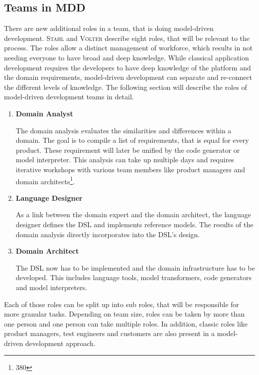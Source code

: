 \subsection{Teams in MDD}

There are new additional roles in a team, that is doing model-driven development. \textsc{Stahl} and \textsc{Völter} \cite{stahl_model-driven_2006} describe eight roles, that will be relevant to the process.
The roles allow a distinct management of workforce, which results in not needing everyone to have broad and deep knowledge.
While classical application development requires the developers to have deep knowledge of the platform and the domain requirements, model-driven development can separate and re-connect the different levels of knowledge.
The following section will describe the roles of model-driven development teams in detail.

\begin{enumerate}
	\item \textbf{Domain Analyst}
	
	The domain analysis evaluates the similarities and differences within a domain.
	The goal is to compile a list of requirements, that is equal for every product.
	These requirement will later be unified by the code generator or model interpreter.
	This analysis can take up multiple days and requires iterative workshops with various team members like product managers and domain architects\footnote{\cite{stahl_model-driven_2006} 380}.
	
	\item \textbf{Language Designer}
	
	As a link between the domain expert and the domain architect, the language designer defines the \ac{DSL} and implements reference models.
	The results of the domain analysis directly incorporates into the \ac{DSL}'s design.
	
	\item \textbf{Domain Architect}
	
	The \ac{DSL} now has to be implemented and the domain infrastructure has to be developed.
	This includes language tools, model transformers, code generators and model interpreters.
	
\end{enumerate}

Each of those roles can be split up into sub roles, that will be responsible for more granular tasks.
Depending on team size, roles can be taken by more than one person and one person can take multiple roles.
In addition, classic roles like product managers, test engineers and customers are also present in a model-driven development approach.













